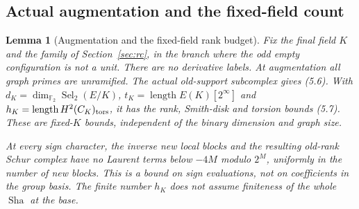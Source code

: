 \documentclass[11pt]{article}
\newtheorem{lemma}[theorem]{Lemma}
\theoremstyle{definition}
\theoremstyle{remark}
\newcommand{\F}{\mathbb F}
\newcommand{\Sel}{\operatorname{Sel}}
\newcommand{\Sha}{\operatorname{Sha}}
\begin{document}
\subsection{Actual augmentation and the fixed-field count}
\begin{lemma}[Augmentation and the fixed-field rank budget]\label{ex:limits-fixed-field-budget}
Fix the final field $K$ and the family of
Section~\ref{sec:rc}, in the branch where the odd empty
configuration is not a unit. There are no derivative labels.
At augmentation all graph primes are unramified.
The actual old-support subcomplex gives (5.6). With
$d_K=\dim_{\F_2}\Sel_2(E/K)$,
$t_K=\operatorname{length}E(K)[2^\infty]$ and
$h_K=\operatorname{length}H^2(C_K)_{\rm tors}$, it has the rank,
Smith-disk and torsion bounds (5.7). These are fixed-$K$ bounds,
independent of the binary dimension and graph size.

At every sign character, the inverse new local blocks and the
resulting old-rank Schur complex have no Laurent terms below
$-4M$ modulo $2^M$, uniformly in the number of new blocks.
This is a bound on sign evaluations, not on coefficients in the
group basis. The finite number $h_K$ does not assume finiteness
of the whole $\Sha$ at the base.
\end{lemma}
\end{document}
